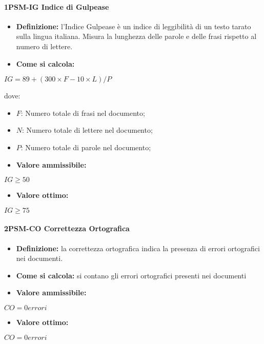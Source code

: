 \paragraph*{1PSM-IG Indice di Gulpease}
\begin{itemize}
    \item \textbf{Definizione:} l’Indice Gulpease è un indice di leggibilità di un testo tarato sulla lingua italiana. Misura la lunghezza delle parole e delle frasi rispetto al numero di lettere.
    \item \textbf{Come si calcola:}
\end{itemize}
\begin{center}
   $IG = 89 + (300 \times F - 10 \times L)/P$ 
\end{center}
dove:
\begin{itemize}[label=$\rightarrow$]
    \item $F$: Numero totale di frasi nel documento;
    \item $N$: Numero totale di lettere nel documento;
    \item $P$: Numero totale di parole nel documento;
\end{itemize}
\begin{itemize}
    \item \textbf{Valore ammissibile:}
\end{itemize}
\begin{center}
    $IG \geq 50$
\end{center}
\begin{itemize}
    \item \textbf{Valore ottimo:}
\end{itemize}
\begin{center}
    $IG \geq 75$
\end{center}

\paragraph*{2PSM-CO Correttezza Ortografica}
\begin{itemize}
    \item \textbf{Definizione:} la correttezza ortografica indica la presenza di errori ortografici nei documenti.
    \item \textbf{Come si calcola:} si contano gli errori ortografici presenti nei documenti
\end{itemize}
\begin{itemize}
    \item \textbf{Valore ammissibile:}
\end{itemize}
\begin{center}
    $CO= 0 errori$
\end{center}
\begin{itemize}
    \item \textbf{Valore ottimo:}
\end{itemize}
\begin{center}
    $CO = 0 errori$
\end{center}

